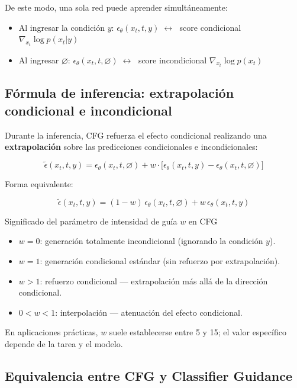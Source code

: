 De este modo, una sola red puede aprender simultáneamente:
\begin{itemize}
    \item Al ingresar la condición $y$: $\epsilon_\theta(x_t, t, y) \;\longleftrightarrow\;$ score condicional $\nabla_{x_t}\log p(x_t|y)$
    \item Al ingresar $\varnothing$: $\epsilon_\theta(x_t, t, \varnothing) \;\longleftrightarrow\;$ score incondicional $\nabla_{x_t}\log p(x_t)$
\end{itemize}

\subsection{Fórmula de inferencia: extrapolación condicional e incondicional}

Durante la inferencia, CFG refuerza el efecto condicional realizando una \textbf{extrapolación} sobre las predicciones condicionales e incondicionales:

$$
\tilde{\epsilon}(x_t, t, y) = \epsilon_\theta(x_t, t, \varnothing) + w \cdot \bigl[\epsilon_\theta(x_t, t, y) - \epsilon_\theta(x_t, t, \varnothing)\bigr]
$$

Forma equivalente:

$$
\tilde{\epsilon}(x_t, t, y) = (1-w)\,\epsilon_\theta(x_t, t, \varnothing) + w\,\epsilon_\theta(x_t, t, y)
$$

\begin{importantbox}{Significado del parámetro de intensidad de guía $w$ en CFG}
\begin{itemize}
    \item $w = 0$: generación totalmente incondicional (ignorando la condición $y$).
    \item $w = 1$: generación condicional estándar (sin refuerzo por extrapolación).
    \item $w > 1$: refuerzo condicional — extrapolación más allá de la dirección condicional.
    \item $0 < w < 1$: interpolación — atenuación del efecto condicional.
\end{itemize}
En aplicaciones prácticas, $w$ suele establecerse entre 5 y 15; el valor específico depende de la tarea y el modelo.
\end{importantbox}

\subsection{Equivalencia entre CFG y Classifier Guidance}

